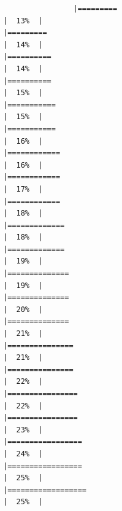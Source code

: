 \documentclass[
]{article}
\begin{document}
\begin{verbatim}
                |=========                                                             |  13%  |                                                                              |=========                                                             |  14%  |                                                                              |==========                                                            |  14%  |                                                                              |==========                                                            |  15%  |                                                                              |===========                                                           |  15%  |                                                                              |===========                                                           |  16%  |                                                                              |============                                                          |  16%  |                                                                              |============                                                          |  17%  |                                                                              |============                                                          |  18%  |                                                                              |=============                                                         |  18%  |                                                                              |=============                                                         |  19%  |                                                                              |==============                                                        |  19%  |                                                                              |==============                                                        |  20%  |                                                                              |==============                                                        |  21%  |                                                                              |===============                                                       |  21%  |                                                                              |===============                                                       |  22%  |                                                                              |================                                                      |  22%  |                                                                              |================                                                      |  23%  |                                                                              |=================                                                     |  24%  |                                                                              |=================                                                     |  25%  |                                                                              |==================                                                    |  25%  |                                                               
\end{verbatim}
\end{document}
